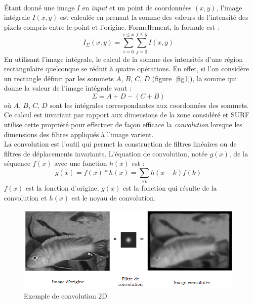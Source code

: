 \documentclass[a4paper,12pt]{report}
\begin{document}
\\Étant donné une image $I$ en \textit{input} et un point de coordonnées $(x,y)$, l'image intégrale $I(x,y)$ est calculée en prenant la somme des valeurs de l'intensité des pixels compris entre le point et l'origine. Formellement, la formule est :
$$I_{\Sigma}(x,y)=\sum_{i=0}^{i\leq x} \sum_{j=0}^{j\leq y} I(x,y)$$
En utilisant l'image intégrale, le calcul de la somme des intensités d'une région rectangulaire quelconque se réduit à quatre opérations. En effet, si l'on considère un rectangle définit par les sommets $A$, $B$, $C$, $D$ (figure~\ref{fig1}), la somme qui donne la valeur de l'image intégrale vaut :
$$ \Sigma = A+D-(C+B)$$
où $A$, $B$, $C$, $D$ sont les intégrales correspondantes aux coordonnées des sommets. Ce calcul est invariant par rapport aux dimensions de la zone considéré et SURF utilise cette propriété pour effectuer de façon efficace la \textit{convolution} lorsque les dimensions des filtres appliqués à l'image varient.
\\La convolution est l'outil qui permet la construction de filtres linéaires ou de filtres de déplacements invariants. L'équation de convolution, notée $g(x)$, de la séquence $f(x)$ avec une fonction $h(x)$ est :
$$g(x)=f(x)\ast h(x)=\sum_{\forall k}h(x-k)f(k)$$
$f(x)$ est la fonction d'origine, $g(x)$ est la fonction qui résulte de la convolution et $h(x)$ est le noyau de convolution.
\begin{figure}[ht]
\centering
\includegraphics[scale=0.3]{figure2.png}
\caption{Exemple de convolution 2D.}
\label{fig2}
\end{figure}
\end{document}
